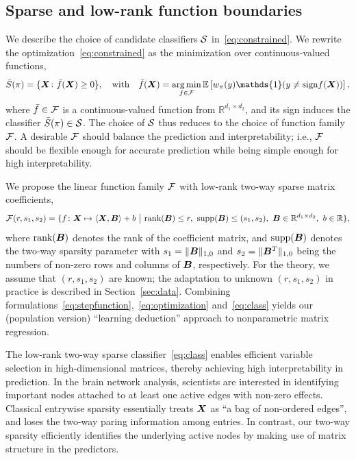 \documentclass[11pt]{article}
\theoremstyle{plain}
\theoremstyle{definition}
\def\sign{\textup{sign}}
\begin{document}
\subsection{Sparse and low-rank function boundaries}\label{subsec:linear class}
We describe the choice of candidate classifiers $\mathcal{S}$ in~\eqref{eq:constrained}. We rewrite the optimization~\eqref{eq:constrained} as the minimization over continuous-valued functions,
\begin{equation}\label{eq:optimization}
\bar S(\pi) = \{\mX\colon\bar f(\mX)\geq 0\},\quad  \text{with}\quad  \bar f(\mX)= \argmin_{f\in\tF}\mathbb{E}\left[w_\pi(y)\mathds{1}(y\neq \sign f(\mX))\right],
\end{equation}
where $\bar f\in\mathcal{F}$ is a continuous-valued function from $\mathbb{R}^{d_1\times d_2}$, and its sign induces the classifier $\bar S(\pi)\in\mathcal{S}$. The choice of $\mathcal{S}$ thus reduces to the choice of function family $\mathcal{F}$. A desirable $\mathcal{F}$ should balance the prediction and interpretability; i.e., $\mathcal{F}$ should be flexible enough for accurate prediction while being simple enough for high interpretability. 

We propose the linear function family $\mathcal{F}$ with low-rank two-way sparse matrix coefficients,
\begin{align}\label{eq:class}
\tF(r,s_1,s_2)=\{f\colon \mX\mapsto \langle \mX, \mB \rangle +b \ \big|\ \text{rank}(\mB)\leq r, \ \text{supp}(\mB)\leq (s_1,s_2), \ \mB\in\mathbb{R}^{d_1\times d_2},\ b\in\mathbb{R}\},
\end{align}
where $\text{rank}(\bm B)$ denotes the rank of the coefficient matrix, and $\text{supp}(\bm B)$ denotes the two-way sparsity parameter with $s_1=\lVert\bm B\rVert_{1,0}$ and $s_2=\lVert\bm B^T\rVert_{1,0}$ being the numbers of non-zero rows and columns of $\bm B$, respectively. For the theory, we assume that $(r,s_1,s_2)$ are known; the adaptation to unknown $(r, s_1, s_2)$ in practice is described in Section~\ref{sec:data}.  
Combining formulations~\eqref{eq:stepfunction},~\eqref{eq:optimization} and~\eqref{eq:class} yields our (population version) ``learning deduction'' approach to nonparametric matrix regression.


The low-rank two-way sparse classifier~\eqref{eq:class} enables efficient variable selection in high-dimensional matrices, thereby achieving high interpretability in prediction. In the brain network analysis, scientists are interested in identifying important nodes attached to at least one active edges with non-zero effects. Classical entrywise sparsity essentially treats $\bm X$ as ``a bag of non-ordered edges'', and loses the two-way paring information among entries. In contrast, our two-way sparsity efficiently identifies the underlying active nodes by making use of matrix structure in the predictors. 
\end{document}
